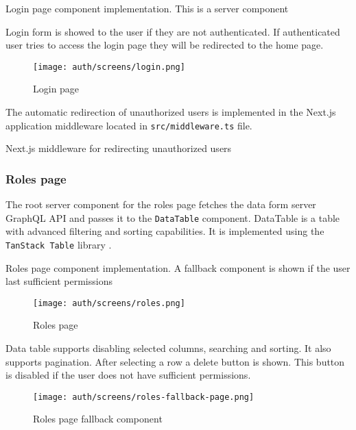 \documentclass[../main.tex]{subfiles}
\begin{document}
\begin{listing}[H]
  \caption{Login page component implementation. This is a server component}
\end{listing}

Login form is showed to the user if they are not authenticated.
If authenticated user tries to access the login page they will be redirected to the home page.

\begin{figure}[H]
  \centering
  \texttt{[image: auth/screens/login.png]}
  \caption{Login page}
\end{figure}

The automatic redirection of unauthorized users is implemented in the Next.js application middleware located in \texttt{src/middleware.ts} file.

\begin{listing}[H]
  \caption{Next.js middleware for redirecting unauthorized users}
\end{listing}

\subsubsection{Roles page}

The root server component for the roles page fetches the data form server GraphQL API and passes it to the \texttt{DataTable} component.
DataTable is a table with advanced filtering and sorting capabilities. It is implemented using the \texttt{TanStack Table} library \cite{tanstack-table}.

\begin{listing}[H]
  \caption{Roles page component implementation. A fallback component is shown if the user last sufficient permissions}
\end{listing}

\begin{figure}[H]
  \centering
  \texttt{[image: auth/screens/roles.png]}
  \caption{Roles page}
\end{figure}

Data table supports disabling selected columns, searching and sorting. It also supports pagination.
After selecting a row a delete button is shown. This button is disabled if the user does not have sufficient permissions.

\begin{figure}[H]
  \centering
  \texttt{[image: auth/screens/roles-fallback-page.png]}
  \caption{Roles page fallback component}
\end{figure}
\end{document}
